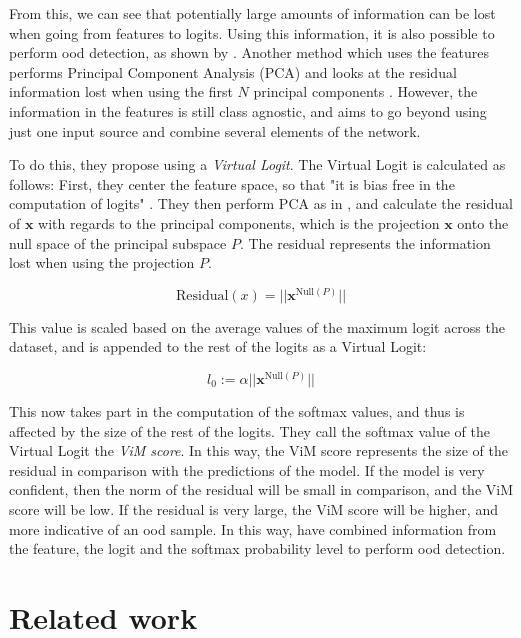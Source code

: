 \documentclass[UKenglish]{uiomasterthesis} %
\theoremstyle{definition}
\begin{document}
From this, we can see that potentially large amounts of information can be lost when going from features to logits. Using this information, it is also possible to perform \ac{ood} detection, as shown by \cite{nusa}. Another method which uses the features performs Principal Component Analysis (PCA) and looks at the residual information lost when using the first $N$ principal components \cite{subspace}. However, the information in the features is still class agnostic, and \cite{vim} aims to go beyond using just one input source and combine several elements of the network.

To do this, they propose using a {\it Virtual Logit}. The Virtual Logit is calculated as follows: First, they center the feature space, so that "it is bias free in the computation of logits" \cite{vim}. They then perform PCA as in \cite{subspace}, and calculate the residual of $\bm{x}$ with regards to the principal components, which is the projection $\bm{x}$ onto the null space of the principal subspace $P$. The residual represents the information lost when using the projection $P$.

\begin{equation}
\text{Residual}(x) = || \bm{x}^{\text{Null}(P)}||
\label{virtuallogit}
\end{equation}

This value is scaled based on the average values of the maximum logit across the dataset, and is appended to the rest of the logits as a Virtual Logit:

\begin{equation}
l_0 := \alpha || \bm{x}^{\text{Null}(P)}||
\label{virtuallogit}
\end{equation}

This now takes part in the computation of the softmax values, and thus is affected by the size of the rest of the logits. They call the softmax value of the Virtual Logit the {\it ViM score}. In this way, the ViM score represents the size of the residual in comparison with the predictions of the model. If the model is very confident, then the norm of the residual will be small in comparison, and the ViM score will be low. If the residual is very large, the ViM score will be higher, and more indicative of an \ac{ood} sample. In this way, \cite{vim} have combined information from the feature, the logit and the softmax probability level to perform \ac{ood} detection.

\section{Related work} \label{section:relatedwork}
\end{document}
